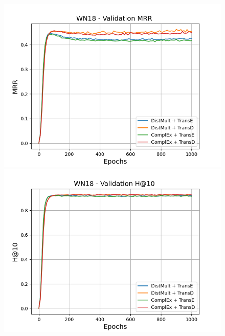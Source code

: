 \begin{figure}[H]
    \centering
    \begin{minipage}{.5\textwidth}
      \centering
      \includegraphics[width=\linewidth]{figures/results/gan_train/not_pretrained/uncertainty/max_distribution/entropy/wn18/1k_epochs/uncertainty_wn18_mrrs.png}
    \end{minipage}%
    \begin{minipage}{.5\textwidth}
      \centering
      \includegraphics[width=\linewidth]{figures/results/gan_train/not_pretrained/uncertainty/max_distribution/entropy/wn18/1k_epochs/uncertainty_wn18_hit10.png}
    \end{minipage}
    

\end{figure}
